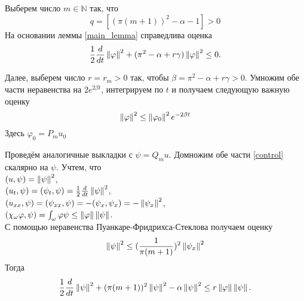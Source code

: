 \par
\vspace{2ex}
Выберем число $m \in \mathbb{N}$ так, что 
\begin{equation}
	q = [(\pi(m + 1))^2 - \alpha - 1] > 0	
\end{equation}
На основании леммы \ref{main_lemma} справедлива оценка
\begin{equation*}
	\frac{1}{2} \frac{d}{dt} \left\lVert\varphi\right\rVert^2 + (\pi^2 - \alpha + r\gamma) \left\lVert\varphi\right\rVert^2 \le 0.
\end{equation*}

Далее, выберем число $r = r_m > 0$ так, чтобы $\beta = \pi^2 - \alpha + r\gamma > 0$. 
Умножим обе части неравенства на $2e^{2\beta t}$, интегрируем по $t$ и получаем следующую важную оценку
\begin{equation}\label{phi_mark}
	\left\lVert\varphi\right\rVert^2 \le \left\lVert\varphi_0\right\rVert^2 e^{-2\beta t}
\end{equation}
Здесь $\varphi_0 = P_m u_0$
\vspace{2em}

Проведём аналогичные выкладки с $\psi = Q_m u$. Домножим обе части \eqref{control} скалярно на $\psi$. Учтем, что \\
$(u, \psi) = \left\lVert\psi\right\rVert^2$,\\
$(u_t, \psi) = (\psi_t, \psi) = \frac{1}{2} \frac{d}{dt} \left\lVert\psi\right\rVert^2$,\\
$(u_{xx}, \psi) = (\psi_{xx}, \psi) = -(\psi_x, \psi_x) = - \left\lVert\psi_x\right\rVert^2$,\\
$(\chi_{\omega}\varphi, \psi) = \int_{\omega}{\varphi \psi} \le \left\lVert\varphi\right\rVert \left\lVert\psi\right\rVert$.\\

С помощью неравенства Пуанкаре-Фридрихса-Стеклова получаем оценку
\begin{equation}
 	\left\lVert\psi\right\rVert^2 \le (\frac{1}{\pi(m + 1)})^2 \left\lVert\psi_x\right\rVert^2
\end{equation}
Тогда
\begin{equation}\label{v2}
	\frac{1}{2} \frac{d}{dt} \left\lVert\psi\right\rVert^2 + (\pi(m + 1))^2 \left\lVert\psi\right\rVert^2 - \alpha \left\lVert\psi\right\rVert^2 \le r \left\lVert\varphi\right\rVert \left\lVert\psi\right\rVert.				
\end{equation}


